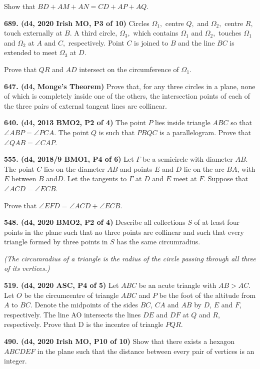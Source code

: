 \documentclass{article}
\begin{document}
Show that $BD+AM+AN=CD+AP+AQ$.

\textbf{689. (\color{red}d4\color{black}, 2020 Irish MO, P3 of 10)} Circles $\Omega_{1},$ centre $Q,$ and $\Omega_{2},$ centre $R,$ touch externally at $B .$ A third circle, $\Omega_{3},$ which contains $\Omega_{1}$ and $\Omega_{2},$ touches $\Omega_{1}$ and $\Omega_{2}$ at $A$ and $C,$ respectively. Point $C$ is joined to $B$ and the line $B C$ is extended to meet $\Omega_{3}$ at $D$.

Prove that $Q R$ and $A D$ intersect on the circumference of $\Omega_{1}$.

\textbf{647. (\color{red}d4\color{black}, Monge's Theorem)} Prove that, for any three circles in a plane, none of which is completely inside one of the others, the intersection points of each of the three pairs of external tangent lines are collinear.

\textbf{640. (\color{red}d4\color{black}, 2013 BMO2, P2 of 4)} The point $P$ lies inside triangle $ABC$ so that $\angle ABP = \angle PCA$. The point $Q$ is such that $PBQC$ is a parallelogram. Prove that $\angle QAB = \angle CAP$.

\textbf{555. (\color{red}d4\color{black}, 2018/9 BMO1, P4 of 6)} Let $\Gamma$ be a semicircle with diameter $AB$. The point $C$ lies on the diameter $AB$ and points $E$ and $D$ lie on the arc $BA$, with $E$ between $B$ and$D$. Let the tangents to $\Gamma$ at $D$ and $E$ meet at $F$. Suppose that $\angle ACD=\angle ECB$.

Prove that $\angle EFD=\angle ACD+\angle ECB$.

\textbf{548. (\color{red}d4\color{black}, 2020 BMO2, P2 of 4)} Describe all collections $S$ of at least four points in the plane such that no three points are collinear and such that every triangle formed by three points in $S$ has the same circumradius.

\emph{(The circumradius of a triangle is the radius of the circle passing through all three of its vertices.)}

\textbf{519. (\color{red}d4\color{black}, 2020 ASC, P4 of 5)} Let $ABC$ be an acute triangle with $AB > AC$. Let $O$ be the circumcentre of triangle $ABC$ and $P$ be the foot of the altitude from $A$ to $BC$. Denote the midpoints of the sides $BC$, $CA$ and $AB$ by $D$, $E$ and $F$, respectively. The line AO intersects the lines $DE$ and $DF$ at $Q$ and $R$, respectively.
Prove that D is the incentre of triangle $P QR$.

\textbf{490. (\color{red}d4\color{black}, 2020 Irish MO, P10 of 10)} Show that there exists a hexagon $A B C D E F$ in the plane such that the distance between every pair of vertices is an integer.
\end{document}
